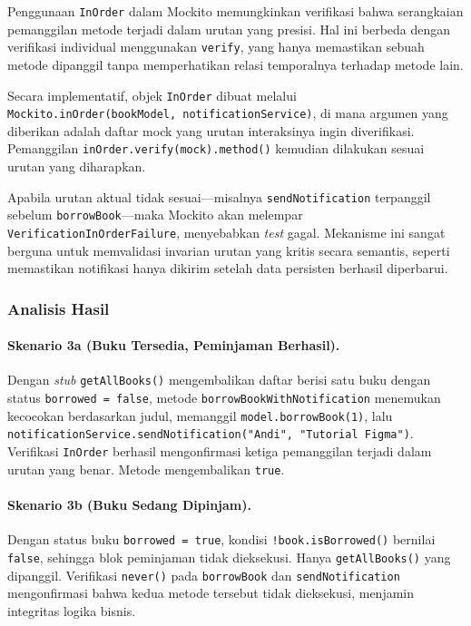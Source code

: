 \documentclass[12pt,a4paper]{article}
\begin{document}
Penggunaan \texttt{InOrder} dalam Mockito memungkinkan verifikasi bahwa
serangkaian pemanggilan metode terjadi dalam urutan yang presisi. Hal ini
berbeda dengan verifikasi individual menggunakan \texttt{verify}, yang hanya
memastikan sebuah metode dipanggil tanpa memperhatikan relasi temporalnya
terhadap metode lain.

Secara implementatif, objek \texttt{InOrder} dibuat melalui
\texttt{Mockito.inOrder(bookModel, notificationService)}, di mana argumen yang
diberikan adalah daftar mock yang urutan interaksinya ingin diverifikasi.
Pemanggilan \texttt{inOrder.verify(mock).method()} kemudian dilakukan sesuai
urutan yang diharapkan.

Apabila urutan aktual tidak sesuai—misalnya \texttt{sendNotification} terpanggil
sebelum \texttt{borrowBook}—maka Mockito akan melempar
\texttt{VerificationInOrderFailure}, menyebabkan \textit{test} gagal.
Mekanisme ini sangat berguna untuk memvalidasi invarian urutan yang kritis
secara semantis, seperti memastikan notifikasi hanya dikirim setelah data
persisten berhasil diperbarui.

\subsubsection{Analisis Hasil}

\paragraph{Skenario 3a (Buku Tersedia, Peminjaman Berhasil).}
Dengan \textit{stub} \texttt{getAllBooks()} mengembalikan daftar berisi satu
buku dengan status \texttt{borrowed = false}, metode
\texttt{borrowBookWithNotification} menemukan kecocokan berdasarkan judul,
memanggil \texttt{model.borrowBook(1)}, lalu
\texttt{notificationService.sendNotification("Andi", "Tutorial Figma")}.
Verifikasi \texttt{InOrder} berhasil mengonfirmasi ketiga pemanggilan terjadi
dalam urutan yang benar. Metode mengembalikan \texttt{true}.

\paragraph{Skenario 3b (Buku Sedang Dipinjam).}
Dengan status buku \texttt{borrowed = true}, kondisi
\texttt{!book.isBorrowed()} bernilai \texttt{false}, sehingga blok peminjaman
tidak dieksekusi. Hanya \texttt{getAllBooks()} yang dipanggil. Verifikasi
\texttt{never()} pada \texttt{borrowBook} dan \texttt{sendNotification}
mengonfirmasi bahwa kedua metode tersebut tidak dieksekusi, menjamin integritas
logika bisnis.
\end{document}
